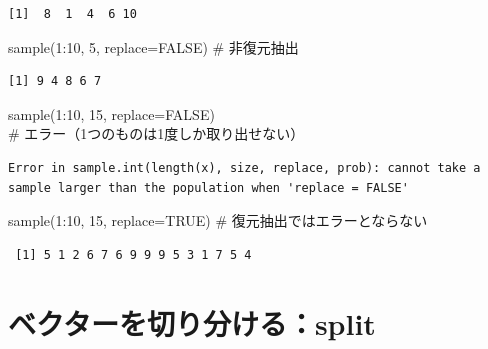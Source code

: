 \documentclass[
  letterpaper,
  DIV=11,
  numbers=noendperiod]{scrreprt}
\newenvironment{Shaded}{\begin{snugshade}}{\end{snugshade}}
\newcommand{\AttributeTok}[1]{\textcolor[rgb]{0.40,0.45,0.13}{#1}}
\newcommand{\CommentTok}[1]{\textcolor[rgb]{0.37,0.37,0.37}{#1}}
\newcommand{\ConstantTok}[1]{\textcolor[rgb]{0.56,0.35,0.01}{#1}}
\newcommand{\DecValTok}[1]{\textcolor[rgb]{0.68,0.00,0.00}{#1}}
\newcommand{\FunctionTok}[1]{\textcolor[rgb]{0.28,0.35,0.67}{#1}}
\newcommand{\NormalTok}[1]{\textcolor[rgb]{0.00,0.23,0.31}{#1}}
\newcommand{\SpecialCharTok}[1]{\textcolor[rgb]{0.37,0.37,0.37}{#1}}
\begin{document}
\begin{verbatim}
[1]  8  1  4  6 10
\end{verbatim}

\begin{Shaded}
\begin{Highlighting}[]
\FunctionTok{sample}\NormalTok{(}\DecValTok{1}\SpecialCharTok{:}\DecValTok{10}\NormalTok{, }\DecValTok{5}\NormalTok{, }\AttributeTok{replace=}\ConstantTok{FALSE}\NormalTok{) }\CommentTok{\# 非復元抽出}
\end{Highlighting}
\end{Shaded}

\begin{verbatim}
[1] 9 4 8 6 7
\end{verbatim}

\begin{Shaded}
\begin{Highlighting}[]
\FunctionTok{sample}\NormalTok{(}\DecValTok{1}\SpecialCharTok{:}\DecValTok{10}\NormalTok{, }\DecValTok{15}\NormalTok{, }\AttributeTok{replace=}\ConstantTok{FALSE}\NormalTok{) }\CommentTok{\# エラー（1つのものは1度しか取り出せない）}
\end{Highlighting}
\end{Shaded}

\begin{verbatim}
Error in sample.int(length(x), size, replace, prob): cannot take a sample larger than the population when 'replace = FALSE'
\end{verbatim}

\begin{Shaded}
\begin{Highlighting}[]
\FunctionTok{sample}\NormalTok{(}\DecValTok{1}\SpecialCharTok{:}\DecValTok{10}\NormalTok{, }\DecValTok{15}\NormalTok{, }\AttributeTok{replace=}\ConstantTok{TRUE}\NormalTok{) }\CommentTok{\# 復元抽出ではエラーとならない}
\end{Highlighting}
\end{Shaded}

\begin{verbatim}
 [1] 5 1 2 6 7 6 9 9 9 5 3 1 7 5 4
\end{verbatim}

\hypertarget{ux30d9ux30afux30bfux30fcux3092ux5207ux308aux5206ux3051ux308bsplit}{%
\section{ベクターを切り分ける：split}\label{ux30d9ux30afux30bfux30fcux3092ux5207ux308aux5206ux3051ux308bsplit}}
\end{document}
